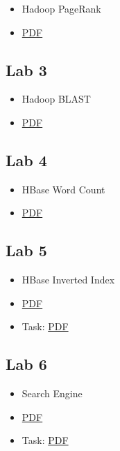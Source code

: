 \begin{itemize}

\item
  Hadoop PageRank
\item
  \href{https://drive.google.com/open?id=0B88HKpainTSfTWhTaEs0R05RRkE}{PDF}
\end{itemize}

\subsection{Lab 3}\label{lab-3}

\begin{itemize}

\item
  Hadoop BLAST
\item
  \href{https://drive.google.com/open?id=0B88HKpainTSfdUhVOWRyNnZBT0E}{PDF}
\end{itemize}

\subsection{Lab 4}\label{lab-4}

\begin{itemize}

\item
  HBase Word Count
\item
  \href{https://drive.google.com/open?id=0B88HKpainTSfZEE5N2JnN2ZMZGc}{PDF}
\end{itemize}

\subsection{Lab 5}\label{lab-5}

\begin{itemize}

\item
  HBase Inverted Index
\item
  \href{https://drive.google.com/open?id=0B88HKpainTSfM010TVZuTlJnSVE}{PDF}
\item
  Task:
  \href{https://drive.google.com/open?id=0B88HKpainTSfWjEySFdhcjFpZU0}{PDF}
\end{itemize}

\subsection{Lab 6}\label{lab-6}

\begin{itemize}

\item
  Search Engine
\item
  \href{https://drive.google.com/open?id=0B88HKpainTSfWXVuRGlCcFJZSUU}{PDF}
\item
  Task:
  \href{https://drive.google.com/open?id=0B88HKpainTSfLWN1V2Vib19DdTA}{PDF}
\end{itemize}

